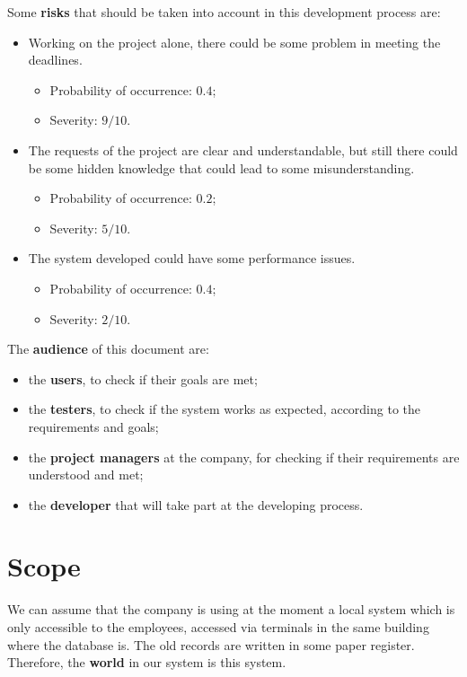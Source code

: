 \documentclass[a4paper,12pt]{book}
\begin{document}
Some \textbf{risks} that should be taken into account in this development process are:
\begin{itemize}
  \item Working on the project alone, there could be some problem in meeting the deadlines.
  \begin{itemize}[noitemsep]
    \item Probability of occurrence: $ 0.4 $;
    \item Severity: $ 9/10 $.
  \end{itemize}
  \item The requests of the project are clear and understandable, but still there could be some hidden knowledge that could lead to some misunderstanding.
  \begin{itemize}[noitemsep]
    \item Probability of occurrence: $ 0.2 $;
    \item Severity: $ 5/10 $.
  \end{itemize}
  \item The system developed could have some performance issues.
  \begin{itemize}[noitemsep]
    \item Probability of occurrence: $ 0.4 $;
    \item Severity: $ 2/10 $.
  \end{itemize}
\end{itemize}

The \textbf{audience} of this document are:
\begin{itemize}
  \item the \textbf{users}, to check if their goals are met;
  \item the \textbf{testers}, to check if the system works as expected, according to the requirements and goals;
  \item the \textbf{project managers} at the company, for checking if their requirements are understood and met;
  \item the \textbf{developer} that will take part at the developing process.
\end{itemize}

\section{Scope}
We can assume that the company is using at the moment a local system which is only accessible to the employees, accessed via terminals in the same building where the database is. The old records are written in some paper register. Therefore, the \textbf{world} in our system is this system.\newline
\end{document}
